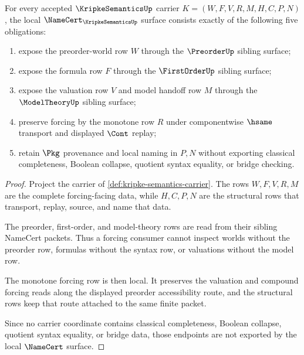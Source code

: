 \begin{theorem}
\label{thm:kripke-semantics-namecert-obligations}
For every accepted $\KripkeSemanticsUp$ carrier $K=(W,F,V,R,M,H,C,P,N)$, the local $\NameCert_{\KripkeSemanticsUp}$ surface consists exactly of the following five obligations:
\begin{enumerate}
\item expose the preorder-world row $W$ through the $\PreorderUp$ sibling surface;
\item expose the formula row $F$ through the $\FirstOrderUp$ sibling surface;
\item expose the valuation row $V$ and model handoff row $M$ through the $\ModelTheoryUp$ sibling surface;
\item preserve forcing by the monotone row $R$ under componentwise $\hsame$ transport and displayed $\Cont$ replay;
\item retain $\Pkg$ provenance and local naming in $P,N$ without exporting classical completeness, Boolean collapse, quotient syntax equality, or bridge checking.
\end{enumerate}
\end{theorem}
\begin{proof}
Project the carrier of \autoref{def:kripke-semantics-carrier}. The rows $W,F,V,R,M$ are the complete forcing-facing data, while $H,C,P,N$ are the structural rows that transport, replay, source, and name that data.

The preorder, first-order, and model-theory rows are read from their sibling NameCert packets. Thus a forcing consumer cannot inspect worlds without the preorder row, formulas without the syntax row, or valuations without the model row.

The monotone forcing row is then local. It preserves the valuation and compound forcing reads along the displayed preorder accessibility route, and the structural rows keep that route attached to the same finite packet.

Since no carrier coordinate contains classical completeness, Boolean collapse, quotient syntax equality, or bridge data, those endpoints are not exported by the local $\NameCert$ surface.
\end{proof}

